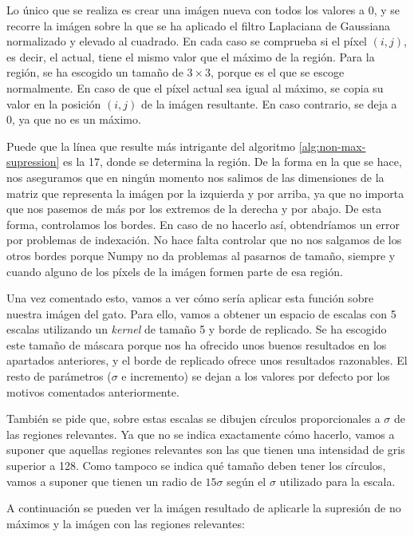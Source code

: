 \documentclass[11pt,a4paper]{article}
\begin{document}
Lo único que se realiza es crear una imágen nueva con todos los valores a 0, y se recorre la imágen sobre la que se
ha aplicado el filtro Laplaciana de Gaussiana normalizado y elevado al cuadrado. En cada caso se comprueba si el píxel
$(i, j)$, es decir, el actual, tiene el mismo valor que el máximo de la región. Para la región, se ha escogido un
tamaño de $3 \times 3$, porque es el que se escoge normalmente. En caso de que el píxel actual sea igual al máximo, se copia
su valor en la posición $(i, j)$ de la imágen resultante. En caso contrario, se deja a 0, ya que no es un máximo.

Puede que la línea que resulte más intrigante del algoritmo \ref{alg:non-max-supression} es la 17, donde se determina
la región. De la forma en la que se hace, nos aseguramos que en ningún momento nos salimos de las dimensiones de la
matriz que representa la imágen por la izquierda y por arriba, ya que no importa que nos pasemos de más por los extremos
de la derecha y por abajo. De esta forma, controlamos los bordes. En caso de no hacerlo así, obtendríamos un error por
problemas de indexación. No hace falta controlar que no nos salgamos de los otros bordes porque Numpy no da problemas
al pasarnos de tamaño, siempre y cuando alguno de los píxels de la imágen formen parte de esa región.

Una vez comentado esto, vamos a ver cómo sería aplicar esta función sobre nuestra imágen del gato. Para ello, vamos
a obtener un espacio de escalas con 5 escalas utilizando un \textit{kernel} de tamaño 5 y borde de replicado. Se ha
escogido este tamaño de máscara porque nos ha ofrecido unos buenos resultados en los apartados anteriores, y el borde
de replicado ofrece unos resultados razonables. El resto de parámetros ($\sigma$ e incremento) se dejan a los valores
por defecto por los motivos comentados anteriormente.

También se pide que, sobre estas escalas se dibujen círculos proporcionales a $\sigma$ de las regiones relevantes. Ya
que no se indica exactamente cómo hacerlo, vamos a suponer que aquellas regiones relevantes son las que tienen una intensidad
de gris superior a 128. Como tampoco se indica qué tamaño deben tener los círculos, vamos a suponer que tienen un radio de
$15\sigma$ según el $\sigma$ utilizado para la escala.

A continuación se pueden ver la imágen resultado de aplicarle la supresión de no máximos y la imágen con las regiones relevantes:
\end{document}
